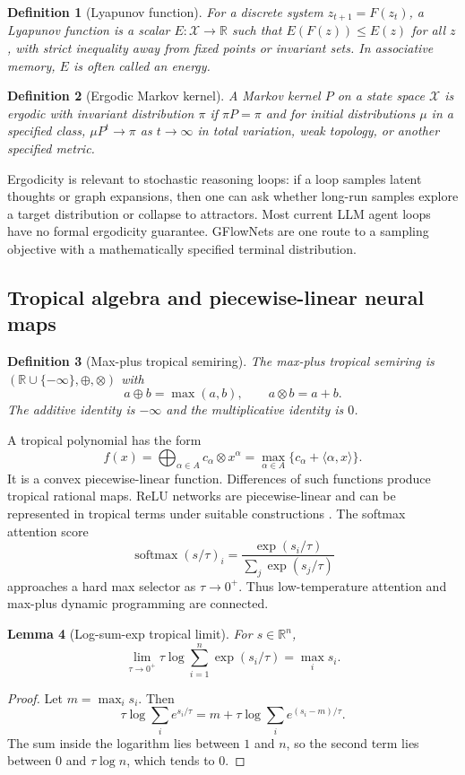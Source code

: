 \documentclass[11pt]{article}
\newtheorem{definition}{Definition}[section]
\newtheorem{lemma}[definition]{Lemma}
\newcommand{\R}{\mathbb{R}}
\newcommand{\calX}{\mathcal{X}}
\newcommand{\softmax}{\operatorname{softmax}}
\newcommand{\1}{\mathbf{1}}
\begin{document}
\begin{definition}[Lyapunov function]
For a discrete system $z_{t+1}=F(z_t)$, a Lyapunov function is a scalar $E:\calX\to\R$ such that $E(F(z))\le E(z)$ for all $z$, with strict inequality away from fixed points or invariant sets. In associative memory, $E$ is often called an energy.
\end{definition}

\begin{definition}[Ergodic Markov kernel]
A Markov kernel $P$ on a state space $\calX$ is ergodic with invariant distribution $\pi$ if $\pi P=\pi$ and for initial distributions $\mu$ in a specified class, $\mu P^t\to\pi$ as $t\to\infty$ in total variation, weak topology, or another specified metric.
\end{definition}

Ergodicity is relevant to stochastic reasoning loops: if a loop samples latent thoughts or graph expansions, then one can ask whether long-run samples explore a target distribution or collapse to attractors. Most current LLM agent loops have no formal ergodicity guarantee. GFlowNets are one route to a sampling objective with a mathematically specified terminal distribution.

\subsection{Tropical algebra and piecewise-linear neural maps}

\begin{definition}[Max-plus tropical semiring]
The max-plus tropical semiring is $(\R\cup\{-\infty\},\oplus,\otimes)$ with
\[
a\oplus b=\max(a,b),\qquad a\otimes b=a+b.
\]
The additive identity is $-\infty$ and the multiplicative identity is $0$.
\end{definition}

A tropical polynomial has the form
\[
f(x)=\bigoplus_{\alpha\in A} c_\alpha\otimes x^\alpha
=\max_{\alpha\in A}\{c_\alpha+\langle\alpha,x\rangle\}.
\]
It is a convex piecewise-linear function. Differences of such functions produce tropical rational maps. ReLU networks are piecewise-linear and can be represented in tropical terms under suitable constructions \cite{ZhangTropical2018,Brandenburg2024}. The softmax attention score
\[
\softmax(s/\tau)_i=\frac{\exp(s_i/\tau)}{\sum_j\exp(s_j/\tau)}
\]
approaches a hard max selector as $\tau\to0^+$. Thus low-temperature attention and max-plus dynamic programming are connected.

\begin{lemma}[Log-sum-exp tropical limit]
For $s\in\R^n$,
\[
\lim_{\tau\to0^+}\tau\log\sum_{i=1}^n \exp(s_i/\tau)=\max_i s_i.
\]
\end{lemma}
\begin{proof}
Let $m=\max_i s_i$. Then
\[
\tau\log\sum_i e^{s_i/\tau}=m+\tau\log\sum_i e^{(s_i-m)/\tau}.
\]
The sum inside the logarithm lies between $1$ and $n$, so the second term lies between $0$ and $\tau\log n$, which tends to $0$.
\end{proof}
\end{document}
